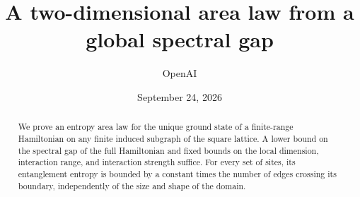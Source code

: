 \documentclass[11pt]{article}
\title{A two-dimensional area law from a global spectral gap}
\author{OpenAI}
\date{September 24, 2026}
\numberwithin{equation}{section}
\theoremstyle{definition}
\theoremstyle{remark}
\begin{document}
\maketitle
\begin{abstract}
We prove an entropy area law for the unique ground state of a finite-range
Hamiltonian on any finite induced subgraph of the square lattice. A lower bound
on the spectral gap of the full Hamiltonian and fixed bounds on the local
dimension, interaction range, and interaction strength suffice. For every set
of sites, its entanglement entropy is bounded by a constant times the number of
edges crossing its boundary, independently of the size and shape of the domain.
\end{abstract}
\tableofcontents
\clearpage











\begingroup
\small


\endgroup
\end{document}
